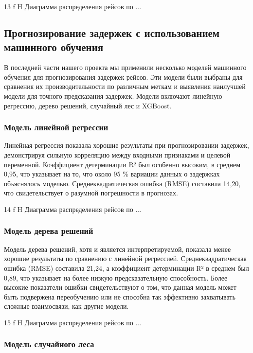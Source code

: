 {13}
{f}
{H}
{\textwidth}
{Диаграмма распределения рейсов по ...}

\subsection{Прогнозирование задержек с использованием машинного обучения}

В последней части нашего проекта мы применили несколько моделей машинного обучения для прогнозирования задержек рейсов.
Эти модели были выбраны для сравнения их производительности по различным меткам и выявления наилучшей модели для точного предсказания задержек.
Модели включают линейную регрессию, дерево решений, случайный лес и XGBoost.

\subsubsection{Модель линейной регрессии}

Линейная регрессия показала хорошие результаты при прогнозировании задержек, демонстрируя сильную корреляцию между входными признаками и целевой переменной.
Коэффициент детерминации R² был особенно высоким, в среднем 0,95, что указывает на то, что около 95
\% вариации данных о задержках объяснялось моделью.
Среднеквадратическая ошибка (RMSE) составила 14,20, что свидетельствует о разумной погрешности в прогнозах.

{14}
{f}
{H}
{\textwidth}
{Диаграмма распределения рейсов по ...}

\subsubsection{Модель дерева решений}

Модель дерева решений, хотя и является интерпретируемой, показала менее хорошие результаты по сравнению с линейной регрессией.
Среднеквадратическая ошибка (RMSE) составила 21,24, а коэффициент детерминации R² в среднем был 0,89, что указывает на более низкую предсказательную способность.
Более высокие показатели ошибки свидетельствуют о том, что данная модель может быть подвержена переобучению или не способна так эффективно захватывать сложные взаимосвязи, как другие модели.

{15}
{f}
{H}
{\textwidth}
{Диаграмма распределения рейсов по ...}

\subsubsection{Модель случайного леса}


